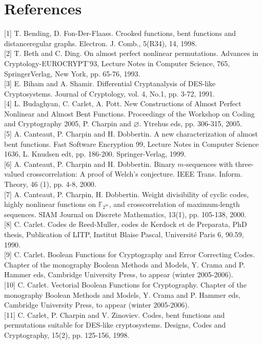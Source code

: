 \documentclass[10pt]{article}
\begin{document}
\section*{References}
[1] T. Bending, D. Fon-Der-Flaass. Crooked functions, bent functions and distanceregular graphs. Electron. J. Comb., 5(R34), 14, 1998.\\[0pt]
[2] T. Beth and C. Ding. On almost perfect nonlinear permutations. Advances in Cryptology-EUROCRYPT'93, Lecture Notes in Computer Science, 765, SpringerVerlag, New York, pp. 65-76, 1993.\\[0pt]
[3] E. Biham and A. Shamir. Differential Cryptanalysis of DES-like Cryptosystems. Journal of Cryptology, vol. 4, No.1, pp. 3-72, 1991.\\[0pt]
[4] L. Budaghyan, C. Carlet, A. Pott. New Constructions of Almost Perfect Nonlinear and Almost Bent Functions. Proceedings of the Workshop on Coding and Cryptography 2005, P. Charpin and $\varnothing$. Ytrehus eds, pp. 306-315, 2005.\\[0pt]
[5] A. Canteaut, P. Charpin and H. Dobbertin. A new characterization of almost bent functions. Fast Software Encryption 99, Lecture Notes in Computer Science 1636, L. Knudsen edt, pp. 186-200. Springer-Verlag, 1999.\\[0pt]
[6] A. Canteaut, P. Charpin and H. Dobbertin. Binary $m$-sequences with three-valued crosscorrelation: A proof of Welch's conjecture. IEEE Trans. Inform. Theory, 46 (1), pp. 4-8, 2000.\\[0pt]
[7] A. Canteaut, P. Charpin, H. Dobbertin. Weight divisibility of cyclic codes, highly nonlinear functions on $\mathbb{F}_{2^{m}}$, and crosscorrelation of maximum-length sequences. SIAM Journal on Discrete Mathematics, 13(1), pp. 105-138, 2000.\\[0pt]
[8] C. Carlet. Codes de Reed-Muller, codes de Kerdock et de Preparata, PhD thesis, Publication of LITP, Institut Blaise Pascal, Université Paris 6, 90.59, 1990.\\[0pt]
[9] C. Carlet. Boolean Functions for Cryptography and Error Correcting Codes. Chapter of the monography Boolean Methods and Models, Y. Crama and P. Hammer eds, Cambridge University Press, to appear (winter 2005-2006).\\[0pt]
[10] C. Carlet. Vectorial Boolean Functions for Cryptography. Chapter of the monography Boolean Methods and Models, Y. Crama and P. Hammer eds, Cambridge University Press, to appear (winter 2005-2006).\\[0pt]
[11] C. Carlet, P. Charpin and V. Zinoviev. Codes, bent functions and permutations suitable for DES-like cryptosystems. Designs, Codes and Cryptography, 15(2), pp. 125-156, 1998.\\[0pt]
\end{document}
